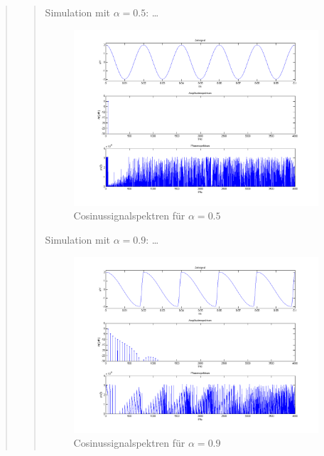 \begin{quote}
\begin{quote}
\begin{center}
		\end{center}
		
		\vspace{1em}
		
		Simulation mit $\alpha = 0.5$: \ldots
		
		\begin{center}
	    
	           \begin{figure}[H]
    			\centering
    				\includegraphics[scale=0.5]{cos_alpha5.png}
    			\caption{Cosinussignalspektren für $\alpha = 0.5$}
    			\end{figure}		
		
		\end{center}
		
		\vspace{1em}
		
		Simulation mit $\alpha = 0.9$: \ldots
		
		\begin{center}
	    
	           \begin{figure}[H]
    			\centering
                    \includegraphics[scale=0.5]{cos_alpha9}
    			\caption{Cosinussignalspektren für $\alpha = 0.9$}
    			\end{figure}	
		

\end{center}
\end{quote}
\end{quote}
